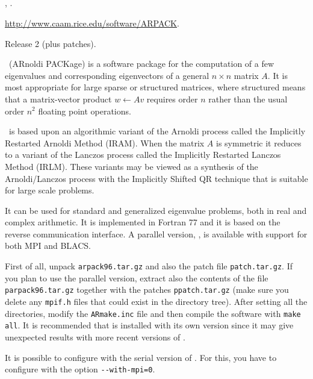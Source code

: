 \subsection*{\underline{\arpack}}
	\begin{description}
	\setlength{\itemsep}{0pt}
	\item[References.]\citep{Lehoucq:1998:AUG}, \citep{Maschhoff:1996:PEP}.
	\item[Website.] \url{http://www.caam.rice.edu/software/ARPACK}.
	\item[Version.] Release 2 (plus patches).
	\item[Summary.] \arpack\ (ARnoldi PACKage) is a software package for the computation of a few eigenvalues and corresponding eigenvectors of a general $n\times n$ matrix $A$. It is most appropriate for large sparse or structured matrices, where structured means that a matrix-vector product $w \leftarrow Av$ requires order $n$ rather than the usual order $n^2$ floating point operations. 
	
	\arpack\ is based upon an algorithmic variant of the Arnoldi process called the Implicitly Restarted Arnoldi Method (IRAM). When the matrix $A$ is symmetric it reduces to a variant of the Lanczos process called the Implicitly Restarted Lanczos Method (IRLM). These variants may be viewed as a synthesis of the Arnoldi/Lanczos process with the Implicitly Shifted QR technique that is suitable for large scale problems. 

	It can be used for standard and generalized eigenvalue problems, both in real and complex arithmetic. It is implemented in Fortran 77 and it is based on the reverse communication interface. A parallel version, \parpack, is available with support for both MPI and BLACS.
	\item[Installation.]
	First of all, unpack \texttt{arpack96.tar.gz} and also the patch file \texttt{patch.tar.gz}. If you plan to use the parallel version, extract also the contents of the file \texttt{parpack96.tar.gz} together with the patches \texttt{ppatch.tar.gz} (make sure you delete any \texttt{mpif.h} files that could exist in the directory tree). After setting all the directories, modify the \texttt{ARmake.inc} file and then compile the software with \texttt{make all}. It is recommended that \arpack is installed with its own \lapack version since it may give unexpected results with more recent versions of \lapack. 

	It is possible to configure \slepc with the serial version of \arpack. For this, you have to configure \petsc with the option \texttt{-{}-with-mpi=0}.
	\end{description}

